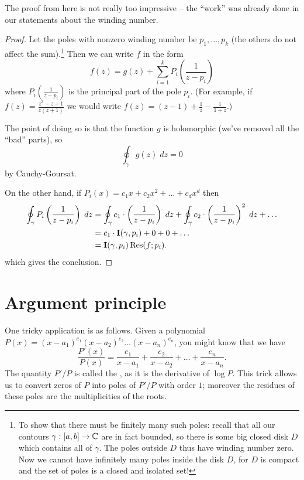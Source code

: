 The proof from here is not really too impressive -- the ``work'' was already
done in our statements about the winding number.
\begin{proof}
	Let the poles with nonzero winding number be $p_1, \dots, p_k$ (the others do not affect the sum).\footnote{
		To show that there must be finitely many such poles: recall that all our contours $\gamma : [a,b] \to \mathbb C$
		are in fact bounded, so there is some big closed disk $D$ which contains all of $\gamma$.
		The poles outside $D$ thus have winding number zero.
		Now we cannot have infinitely many poles inside the disk $D$, for $D$ is compact and the
		set of poles is a closed and isolated set!}
	Then we can write $f$ in the form
	\[
		f(z) = g(z) + \sum_{i=1}^k P_i\left( \frac{1}{z-p_i} \right)
	\]
	where $P_i\left( \frac{1}{z-p_i} \right)$ is the principal part of the pole $p_i$.
	(For example, if $f(z) = \frac{z^3-z+1}{z(z+1)}$ we would write $f(z) = (z-1) + \frac1z - \frac1{1+z}$.)

	The point of doing so is that the function $g$ is holomorphic (we've removed all the ``bad'' parts), so 
	\[ \oint_{\gamma} g(z) \; dz = 0 \]
	by Cauchy-Goursat.

	On the other hand, if $P_i(x) = c_1x + c_2x^2 + \dots + c_d x^d$ then
	\begin{align*}
		\oint_{\gamma} P_i\left( \frac{1}{z-p_i} \right) \; dz
		&=
		\oint_{\gamma} c_1 \cdot \left( \frac{1}{z-p_i} \right) \; dz
		+ \oint_{\gamma} c_2 \cdot \left( \frac{1}{z-p_i} \right)^2 \; dz
		+ \dots \\
		&= c_1 \cdot \operatorname{\mathbf I}(\gamma, p_i) + 0 + 0 + \dots \\
		&= \operatorname{\mathbf I}(\gamma, p_i) \operatorname{Res}(f; p_i).
	\end{align*}
	which gives the conclusion.
\end{proof}

\section{Argument principle}
One tricky application is as follows.
Given a polynomial $P(x) = (x-a_1)^{e_1}(x-a_2)^{e_2}\dots(x-a_n)^{e_n}$, you might know that we have
\[ \frac{P'(x)}{P(x)} = \frac{e_1}{x-a_1} + \frac{e_2}{x-a_2} + \dots + \frac{e_n}{x-a_n}. \]
The quantity $P'/P$ is called the , as it is the derivative of $\log P$.
This trick allows us to convert zeros of $P$ into poles of $P'/P$ with order $1$;
moreover the residues of these poles are the multiplicities of the roots.

